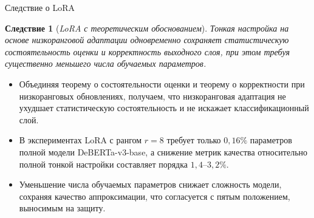 \documentclass[10pt,pdf,hyperref={unicode}]{beamer}
\newtheorem{ruscorollary}{Следствие}
\begin{document}
\begin{frame}{Следствие о LoRA}
\justifying
\footnotesize
\begin{ruscorollary}[\emph{LoRA с теоретическим обоснованием}]
    \justifying
    Тонкая настройка на основе низкоранговой адаптации одновременно сохраняет статистическую состоятельность оценки и корректность выходного слоя, при этом требуя существенно меньшего числа обучаемых параметров.
\end{ruscorollary}

\begin{itemize}
    \item Объединяя теорему о состоятельности оценки и теорему о корректности при низкоранговых обновлениях, получаем, что низкоранговая адаптация не ухудшает статистическую состоятельность и не искажает классификационный слой.
    \item В экспериментах LoRA с рангом $r=8$ требует только $0{,}16\%$ параметров полной модели DeBERTa-v3-base, а снижение метрик качества относительно полной тонкой настройки составляет порядка $1{,}4$--$3{,}2\%$.
    \item Уменьшение числа обучаемых параметров снижает сложность модели, сохраняя качество аппроксимации, что согласуется с пятым положением, выносимым на защиту.
\end{itemize}
\end{frame}
\end{document}
